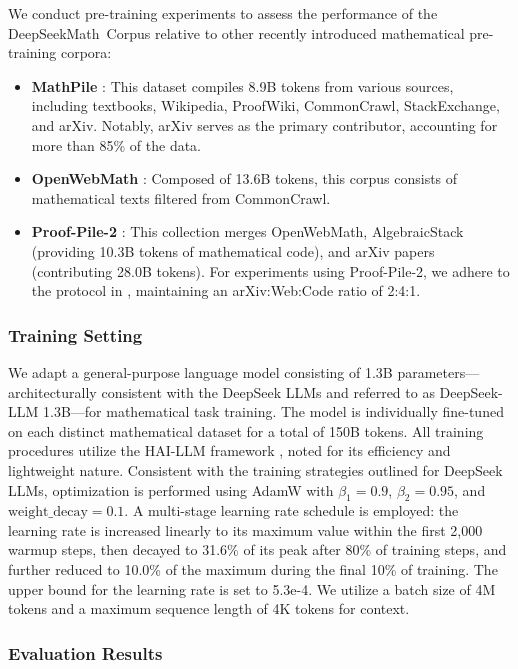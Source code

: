 \begin{itemize}[topsep=0pt]
We conduct pre-training experiments to assess the performance of the DeepSeekMath~Corpus relative to other recently introduced mathematical pre-training corpora:

\begin{itemize}[topsep=0pt]
    \item \textbf{MathPile} \citep{mathpile}: This dataset compiles 8.9B tokens from various sources, including textbooks, Wikipedia, ProofWiki, CommonCrawl, StackExchange, and arXiv. Notably, arXiv serves as the primary contributor, accounting for more than 85\% of the data.
    \item \textbf{OpenWebMath} \citep{openwebmath}: Composed of 13.6B tokens, this corpus consists of mathematical texts filtered from CommonCrawl.
    \item \textbf{Proof-Pile-2} \citep{llemma}: This collection merges OpenWebMath, AlgebraicStack (providing 10.3B tokens of mathematical code), and arXiv papers (contributing 28.0B tokens). For experiments using Proof-Pile-2, we adhere to the protocol in \cite{llemma}, maintaining an arXiv:Web:Code ratio of 2:4:1.
\end{itemize}

\subsubsection{Training Setting}
\label{sec:quality-policy}
We adapt a general-purpose language model consisting of 1.3B parameters—architecturally consistent with the DeepSeek LLMs \citep{deepseek-llm} and referred to as DeepSeek-LLM 1.3B—for mathematical task training. The model is individually fine-tuned on each distinct mathematical dataset for a total of 150B tokens. All training procedures utilize the HAI-LLM framework \citep{haillm}, noted for its efficiency and lightweight nature. Consistent with the training strategies outlined for DeepSeek LLMs, optimization is performed using AdamW \citep{adamW} with $\beta_1=0.9$, $\beta_2=0.95$, and $\mathrm{weight\_decay}=0.1$. A multi-stage learning rate schedule is employed: the learning rate is increased linearly to its maximum value within the first 2,000 warmup steps, then decayed to 31.6\% of its peak after 80\% of training steps, and further reduced to 10.0\% of the maximum during the final 10\% of training. The upper bound for the learning rate is set to 5.3e-4. We utilize a batch size of 4M tokens and a maximum sequence length of 4K tokens for context.

\subsubsection{Evaluation Results}


\end{itemize}
